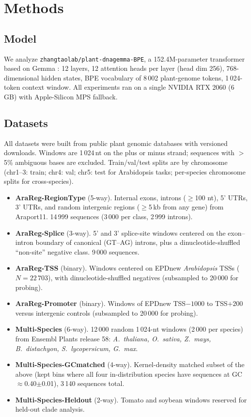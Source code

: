\documentclass{article}
\begin{document}
\section{Methods}

\subsection{Model}

We analyze \texttt{zhangtaolab/plant-dnagemma-BPE}, a 152.4M-parameter
transformer based on Gemma \citep{team2024gemma}: 12 layers, 12 attention
heads per layer (head dim 256), 768-dimensional hidden states, BPE
vocabulary of 8\,002 plant-genome tokens, 1\,024-token context window. All
experiments ran on a single NVIDIA RTX 2060 (6\,GB) with Apple-Silicon MPS
fallback.

\subsection{Datasets}
\label{sec:data}

All datasets were built from public plant genomic databases with versioned
downloads. Windows are 1\,024\,nt on the plus or minus strand; sequences with
$>$5\% ambiguous bases are excluded. Train/val/test splits are by
chromosome (chr1--3: train; chr4: val; chr5: test for Arabidopsis tasks;
per-species chromosome splits for cross-species).

\begin{itemize}
    \item \textbf{AraReg-RegionType} (5-way). Internal exons, introns ($\geq$100
    nt), 5' UTRs, 3' UTRs, and random intergenic regions ($\geq$5\,kb from any
    gene) from Araport11. 14\,999 sequences (3\,000 per class, 2\,999 introns).
    \item \textbf{AraReg-Splice} (3-way). 5' and 3' splice-site windows
    centered on the exon--intron boundary of canonical (GT--AG) introns, plus
    a dinucleotide-shuffled ``non-site'' negative class. 9\,000 sequences.
    \item \textbf{AraReg-TSS} (binary). Windows centered on EPDnew
    \textit{Arabidopsis} TSSs ($N{=}22\,703$), with dinucleotide-shuffled
    negatives (subsampled to 20\,000 for probing).
    \item \textbf{AraReg-Promoter} (binary). Windows of EPDnew TSS$-1000$ to
    TSS$+200$ versus intergenic controls (subsampled to 20\,000 for probing).
    \item \textbf{Multi-Species} (6-way). 12\,000 random 1\,024-nt windows
    (2\,000 per species) from Ensembl Plants release 58:
    \textit{A.~thaliana, O.~sativa, Z.~mays, B.~distachyon, S.~lycopersicum,
    G.~max}.
    \item \textbf{Multi-Species-GCmatched} (4-way). Kernel-density matched
    subset of the above (kept bins where all four in-distribution species
    have sequences at GC$\approx$0.40$\pm$0.01), 3\,140 sequences total.
    \item \textbf{Multi-Species-Heldout} (2-way). Tomato and soybean windows
    reserved for held-out clade analysis.
\end{itemize}
\end{document}
